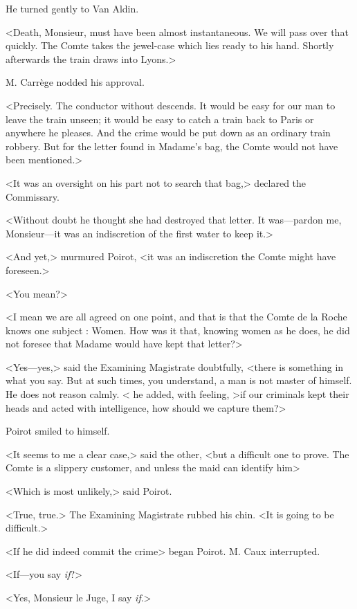 He turned gently to Van Aldin.

<Death, Monsieur, must have been almost instantaneous. We will pass over that quickly. The Comte takes the jewel-case which lies ready to his hand. Shortly afterwards the train draws into Lyons.>

M. Carrège nodded his approval.

<Precisely. The conductor without descends. It would be easy for our man to leave the train unseen; it would be easy to catch a train back to Paris or anywhere he pleases. And the crime would be put down as an ordinary train robbery. But for the letter found in Madame's bag, the Comte would not have been mentioned.>

<It was an oversight on his part not to search that bag,> declared the Commissary.

<Without doubt he thought she had destroyed that letter. It was—pardon me, Monsieur—it was an indiscretion of the first water to keep it.>

<And yet,> murmured Poirot, <it was an indiscretion the Comte might have foreseen.>

<You mean?>

<I mean we are all agreed on one point, and that is that the Comte de la Roche knows one subject : Women. How was it that, knowing women as he does, he did not foresee that Madame would have kept that letter?>

<Yes—yes,> said the Examining Magistrate doubtfully, <there is something in what you say. But at such times, you understand, a man is not master of himself. He does not reason calmly. < he added, with feeling, >if our criminals kept their heads and acted with intelligence, how should we capture them?>

Poirot smiled to himself.

<It seems to me a clear case,> said the other, <but a difficult one to prove. The Comte is a slippery customer, and unless the maid can identify him\longdash>

<Which is most unlikely,> said Poirot.

<True, true.> The Examining Magistrate rubbed his chin. <It is going to be difficult.>

<If he did indeed commit the crime\longdash> began Poirot. M. Caux interrupted.

<If—you say \emph{if}?>

<Yes, Monsieur le Juge, I say \emph{if}.>

